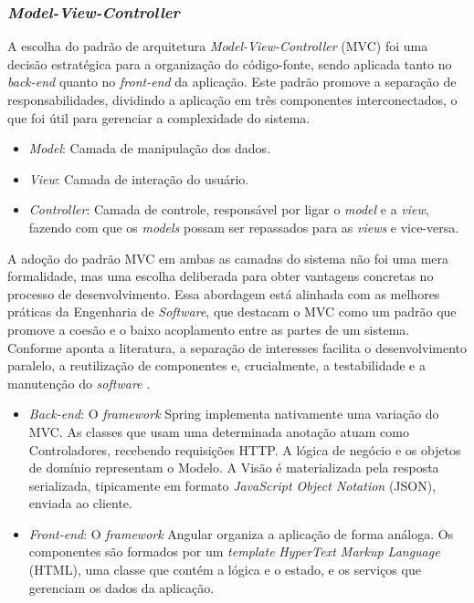 \subsubsection[\textit{Model-View-Controller}]{\textit{Model-View-Controller}}
%
% 
%
A escolha do padrão de arquitetura \textit{Model-View-Controller} (MVC) foi uma decisão estratégica para a organização do código-fonte, sendo aplicada tanto no \textit{back-end} quanto no \textit{front-end} da aplicação. Este padrão promove a separação de responsabilidades, dividindo a aplicação em três componentes interconectados, o que foi útil para gerenciar a complexidade do sistema.

\begin{itemize}
    \item \textit{Model}: Camada de manipulação dos dados.
    \item \textit{View}: Camada de interação do usuário.
    \item \textit{Controller}: Camada de controle, responsável por ligar o \textit{model} e a \textit{view}, fazendo com que os \textit{models} possam ser repassados para as \textit{views} e vice-versa.
\end{itemize}

A adoção do padrão MVC em ambas as camadas do sistema não foi uma mera formalidade, mas uma escolha deliberada para obter vantagens concretas no processo de desenvolvimento. Essa abordagem está alinhada com as melhores práticas da Engenharia de \textit{Software}, que destacam o MVC como um padrão que promove a coesão e o baixo acoplamento entre as partes de um sistema. Conforme aponta a literatura, a separação de interesses facilita o desenvolvimento paralelo, a reutilização de componentes e, crucialmente, a testabilidade e a manutenção do \textit{software} \cite{EngenhariaSoftware2021}.

\begin{itemize}
    \item \textit{Back-end}: O \textit{framework} Spring implementa nativamente uma variação do MVC. As classes que usam uma determinada anotação atuam como Controladores, recebendo requisições HTTP. A lógica de negócio e os objetos de domínio representam o Modelo. A Visão é materializada pela resposta serializada, tipicamente em formato \textit{JavaScript Object Notation} (JSON), enviada ao cliente.
    \item \textit{Front-end}: O \textit{framework} Angular organiza a aplicação de forma análoga. Os componentes são formados por um \textit{template} \textit{HyperText Markup Language} (HTML), uma classe que contém a lógica e o estado, e os serviços que gerenciam os dados da aplicação.
\end{itemize}

